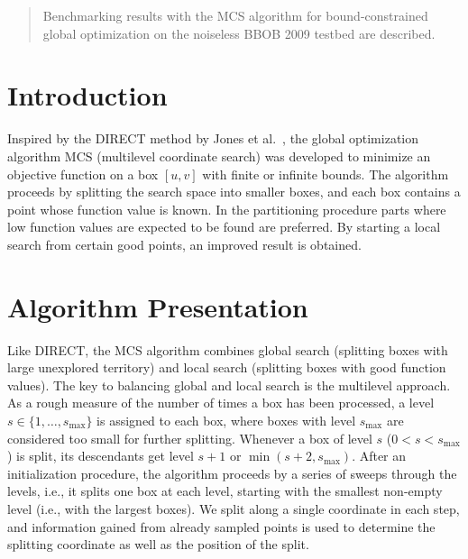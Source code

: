 \documentclass{sig-alternate}
\begin{document}
\maketitle
\begin{abstract}

Benchmarking results with the MCS algorithm for bound-constrained global optimization
on the noiseless BBOB 2009 testbed are described. 

\end{abstract}




\section{Introduction}

Inspired by the {DIRECT} method by Jones et al.~\cite{jones}, the global
optimization algorithm MCS (multilevel coordinate search) \cite{mcs} was developed 
to minimize an objective function on a box $[u,v]$ with finite or infinite bounds.
The algorithm proceeds by splitting the search space into smaller boxes, and each
box contains a point whose function value is known. In the partitioning procedure
parts where low function values are expected to be found are preferred.
By starting a local search from certain good points, an improved result is 
obtained.

\section{Algorithm Presentation}

Like {DIRECT}, the MCS algorithm combines global search (splitting boxes with
large unexplored territory) and local search (splitting boxes with good function
values). The key to balancing global and local search is the multilevel approach.
As a rough measure of the number of times a box has been processed, a level
$s \in \{1,\dots,s_{\max}\}$ is assigned to each box, where boxes with level $s_{\max}$ 
are considered too small for further splitting. Whenever a box of level $s$
($0 < s < s_{\max}$) is split, its descendants get level $s+1$ or $\min(s+2,s_{\max})$.
After an initialization procedure, the algorithm proceeds by a series of sweeps
through the levels, i.e., it splits one box at each level, starting with the 
smallest non-empty level (i.e., with the largest boxes). We split along a single
coordinate in each step, and information gained from already sampled points
is used to determine the splitting coordinate as well as the position of the split.
\end{document}
